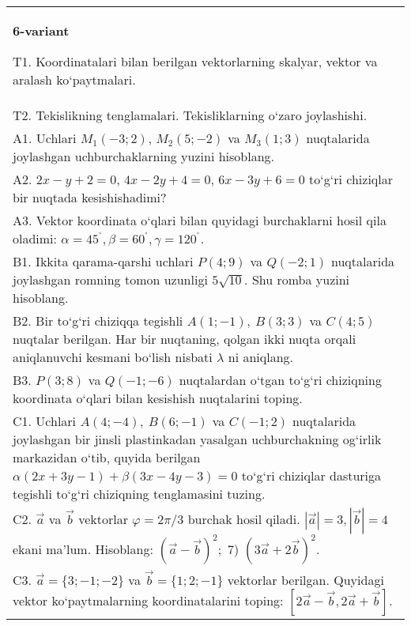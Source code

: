 \documentclass{article}
\begin{document}
\begin{tabular}{m{17cm}}
\textbf{6-variant}

T1. 
Koordinatalari bilan berilgan vektorlarning skalyar, vektor va aralash ko‘paytmalari.
 \\
T2. 
Tekislikning tenglamalari. Tekisliklarning o‘zaro joylashishi.
 \\
A1. 
Uchlari $M_1 (-3;2) $, $M_2 (5;-2) $ va $M_3 (1;3) $
nuqtalarida joylashgan uchburchaklarning yuzini hisoblang.
 \\
A2. 
$2x-y+2=0$, $4x-2y+4=0$, $6x-3y+6=0$
to‘g‘ri chiziqlar bir nuqtada kesishishadimi?
 \\
A3. 
Vektor koordinata o‘qlari bilan quyidagi burchaklarni hosil qila oladimi:
$\alpha = 45^{{^\circ}},\beta = 60^{{^\circ}},\gamma = 120^{{^\circ}}$.
 \\
B1. 
Ikkita qarama-qarshi uchlari \(P (4;9) \) va \(Q (-2; 1) \) nuqtalarida joylashgan romning tomon uzunligi \(5\sqrt{10}\). Shu
romba yuzini hisoblang.
 \\
B2. 
Bir to‘g‘ri chiziqqa tegishli \(A (1;-1),\ B (3;3) \) va
\(C (4;5) \) nuqtalar berilgan. Har bir nuqtaning, qolgan ikki nuqta orqali aniqlanuvchi kesmani bo‘lish nisbati $\lambda$ ni aniqlang.
 \\
B3. 
\(P (3;8) \) va \(Q (-1;-6) \) nuqtalardan o‘tgan
to‘g‘ri chiziqning koordinata o‘qlari bilan kesishish nuqtalarini toping.
 \\
C1. 
Uchlari \(A (4;-4),\ B (6;-1) \) va \(C (-1;2) \)
nuqtalarida joylashgan bir jinsli plastinkadan yasalgan uchburchakning
og‘irlik markazidan o‘tib, quyida berilgan
\(\alpha (2x+3y-1) +\beta (3x-4y-3) =0\) to‘g‘ri chiziqlar dasturiga
tegishli to‘g‘ri chiziqning tenglamasini tuzing.
 \\
C2. 
$\vec{a}$ va $\vec{b}$ vektorlar $\varphi = 2\pi/3$ burchak hosil qiladi. $|\vec{a}| = 3,|\vec{b}| = 4$ ekani ma’lum. Hisoblang:
$ (\vec{a} - \vec{b}) ^{2};$ 7) $ (3\vec{a} + 2\vec{b}) ^{2}$.
 \\
C3. 
$\vec{a} = \{ 3; - 1; - 2\}$ va $\vec{b} = \{ 1;2; - 1\}$ vektorlar berilgan. Quyidagi vektor ko‘paytmalarning koordinatalarini toping:
$\left\lbrack 2\vec{a} - \vec{b},2\vec{a} + \vec{b} \right\rbrack$.
 \\

\end{tabular}
\vspace{1cm}
\end{document}
